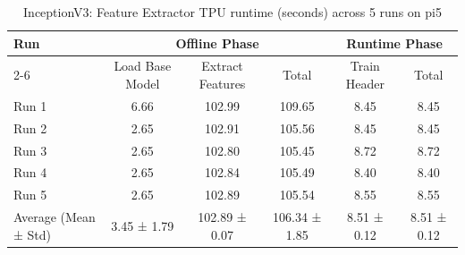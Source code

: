 \begin{table}[t]
\centering
\caption{InceptionV3: Feature Extractor TPU runtime (seconds) across 5 runs on pi5}
\label{tab:runtime_inceptionv3_EdgeTPU_pi5}
\begin{tabular}{lccccc}
\hline
\multirow{2}{*}{Run} & \multicolumn{3}{c}{Offline Phase} & \multicolumn{2}{c}{Runtime Phase} \\
\cline{2-6}
 & Load Base Model & Extract Features & Total & Train Header & Total \\
\hline
  Run 1                  & 6.66           & 102.99         & 109.65         & 8.45           & 8.45           \\
  Run 2                  & 2.65           & 102.91         & 105.56         & 8.45           & 8.45           \\
  Run 3                  & 2.65           & 102.80         & 105.45         & 8.72           & 8.72           \\
  Run 4                  & 2.65           & 102.84         & 105.49         & 8.40           & 8.40           \\
  Run 5                  & 2.65           & 102.89         & 105.54         & 8.55           & 8.55           \\
\hline
  Average (Mean ± Std)   & 3.45 ± 1.79    & 102.89 ± 0.07  & 106.34 ± 1.85  & 8.51 ± 0.12    & 8.51 ± 0.12    \\
\hline
\end{tabular}
\end{table}
